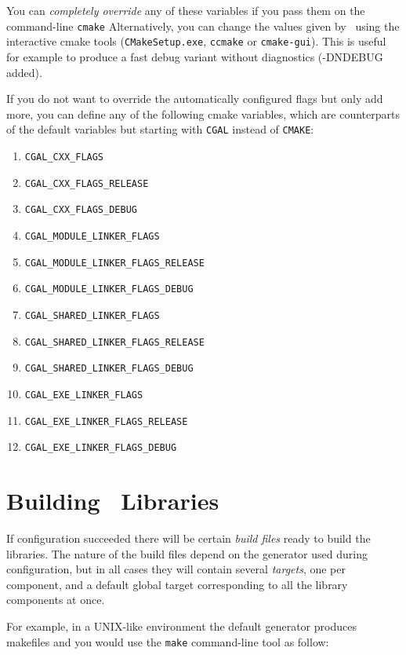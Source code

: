 You can {\em completely override} any of these variables if you pass them on the command-line \texttt{cmake}
Alternatively, you can change the values given by \cmake\ using the
interactive cmake tools (\texttt{CMakeSetup.exe}, \texttt{ccmake} or \texttt{cmake-gui}).  This is useful for example to produce a fast debug
variant without diagnostics (-DNDEBUG added). 

If you do not want to override the automatically configured flags but only add more, you can 
define any of the following cmake variables, which are counterparts of the default
variables but starting with \texttt{CGAL} instead of \texttt{CMAKE}:

\begin{enumerate}
\item \texttt{CGAL\_CXX\_FLAGS}
\item \texttt{CGAL\_CXX\_FLAGS\_RELEASE}
\item \texttt{CGAL\_CXX\_FLAGS\_DEBUG}
\item \texttt{CGAL\_MODULE\_LINKER\_FLAGS}
\item \texttt{CGAL\_MODULE\_LINKER\_FLAGS\_RELEASE}
\item \texttt{CGAL\_MODULE\_LINKER\_FLAGS\_DEBUG}
\item \texttt{CGAL\_SHARED\_LINKER\_FLAGS}
\item \texttt{CGAL\_SHARED\_LINKER\_FLAGS\_RELEASE}
\item \texttt{CGAL\_SHARED\_LINKER\_FLAGS\_DEBUG}
\item \texttt{CGAL\_EXE\_LINKER\_FLAGS}
\item \texttt{CGAL\_EXE\_LINKER\_FLAGS\_RELEASE}
\item \texttt{CGAL\_EXE\_LINKER\_FLAGS\_DEBUG}
\end{enumerate}


\section{Building \cgal\ Libraries}

If configuration succeeded there will be certain {\em build files} ready to build the libraries.
The nature of the build files depend on the generator used during configuration, but in all cases they 
will contain several {\em targets}, one per component,  and a default global target corresponding 
to all the library components at once.

For example, in a UNIX-like environment the default generator produces makefiles and you would
use the \texttt{make} command-line tool as follow:

